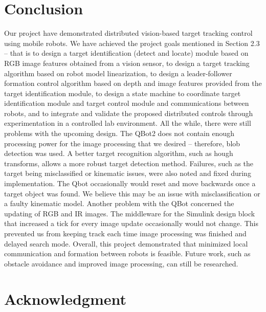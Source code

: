 \documentclass[conference]{IEEEtran}
\begin{document}
\section{Conclusion}
Our project have demonstrated distributed vision-based target tracking control using mobile robots. We have achieved the project goals mentioned in Section 2.3 – that is to design a target identification (detect and locate) module based on RGB image features obtained from a vision sensor, to design a target tracking algorithm based on robot model linearization, to design a leader-follower formation control algorithm based on depth and image features provided from the target identification module, to design a state machine to coordinate target identification module and target control module and communications between robots, and to integrate and validate the proposed distributed controls through experimentation in a controlled lab environment. 
All the while, there were still problems with the upcoming design. The QBot2 does not contain enough processing power for the image processing that we desired – therefore, blob detection was used. A better target recognition algorithm, such as hough transforms, allows a more robust target detection method. Failures, such as the target being misclassified or kinematic issues, were also noted and fixed during implementation. The Qbot occasionally would reset and move backwards once a target object was found. We believe this may be an issue with misclassification or a faulty kinematic model. Another problem with the QBot concerned the updating of RGB and IR images. The middleware for the Simulink design block that increased a tick for every image update occasionally would not change. This prevented us from keeping track each time image processing was finished and delayed search mode.
Overall, this project demonstrated that minimized local communication and formation between robots is feasible. Future work, such as obstacle avoidance and improved image processing, can still be researched.






\section*{Acknowledgment}
\end{document}
